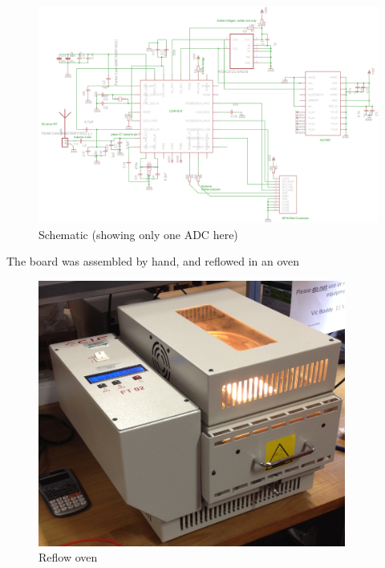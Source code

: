 \documentclass[]{article}
\begin{document}
\begin{figure}[H]
	\begin{center}
		\includegraphics[width = 1.6\textwidth, angle = 90]{Schematic}
	\end{center}
	\caption{Schematic (showing only one ADC here)}
	\label{fig:schematic}
\end{figure}

The board was assembled by hand, and reflowed in an oven

\begin{figure}[htb]
	\begin{center}
		\includegraphics[width = 0.9\textwidth]{oven}
	\end{center}
	\caption{Reflow oven}
	\label{fig:oven}
\end{figure} 
\end{document}
